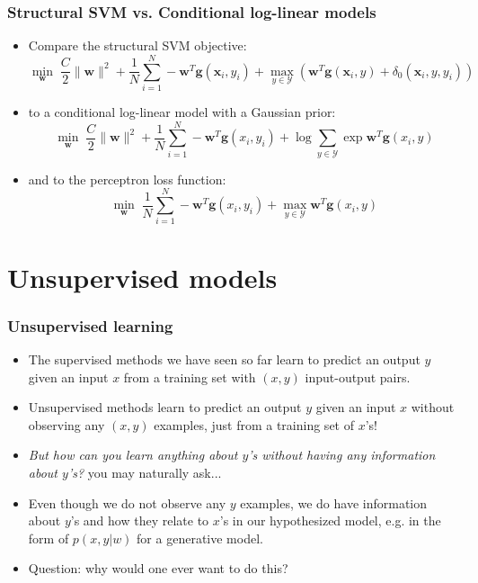 \documentclass[ignorenonframetext,plain,fleqn]{beamer}
\renewcommand{\vec}{\mathbf}
\begin{document}
\begin{frame}\frametitle{Structural SVM vs. Conditional log-linear models}
\begin{itemize}
\item Compare the structural SVM objective: \[
\min_\vec{w}\; 
 \frac{C}{2} \|\vec{w}\|^2
+ \frac{1}{N} \sum_{i=1}^N 
-  \vec{w}^T\vec{g}(\vec{x}_i,y_i) + \max_{y\in\mathcal{Y}}
(  \vec{w}^T\vec{g}(\vec{x}_i,y) + \delta_0(\vec{x}_i,y,y_i))
\]
\item to a conditional log-linear model with a Gaussian prior: \[
\min_\vec{w}\;
 \frac{C}{2} \|\vec{w}\|^2
+ \frac{1}{N} \sum_{i=1}^N 
-\vec{w}^T \vec{g}(x_i,y_i) 
+\log \sum_{y\in\mathcal{Y}} \exp \vec{w}^T \vec{g}(x_i,y) 
\]
\item and to the perceptron loss function: \[
\min_\vec{w}\;
\frac{1}{N} \sum_{i=1}^N 
-\vec{w}^T \vec{g}(x_i,y_i)
+\max_{y\in\mathcal{Y}} \vec{w}^T \vec{g}(x_i,y)
\]
\end{itemize}
\end{frame}

\section{Unsupervised models}
\frame{\sectionpage}

\begin{frame}\frametitle{Unsupervised learning}
\begin{itemize}
\item The supervised methods we have seen so far learn to predict an
  output $y$ given an input $x$ from a training set with $(x, y)$
  input-output pairs.
\item Unsupervised methods learn to predict an output $y$ given an
  input $x$ without observing any $(x, y)$ examples, just from a
  training set of $x$'s!
\item {\sl But how can you learn anything about $y$'s without having
  any information about $y$'s?} you may naturally ask...
\item Even though we do not observe any $y$ examples, we do have
  information about $y$'s and how they relate to $x$'s in our
  hypothesized model, e.g. in the form of $p(x,y|w)$ for a
  generative model.
\item Question: why would one ever want to do this?
\end{itemize}
\end{frame}
\end{document}
